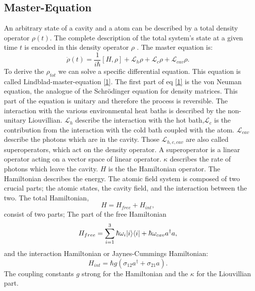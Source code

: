 \documentclass[12pt,a4paper]{article}
\DeclarePairedDelimiter\bra{\langle}{\rvert}
\DeclarePairedDelimiter\ket{\lvert}{\rangle}
\begin{document}
\subsection{Master-Equation} 
An arbitrary state of a cavity and a atom can be described by a total density operator $\rho(t)$. %
The complete description of the total system's state at a given time $t$ is encoded in this density 
operator $\rho$ \cite{Li2017}.
The master equation is:
\begin{equation}
\dot{\rho}(t)=\frac{1}{i \hbar}[H,\rho]+ \mathcal{L}_{h}\rho+ \mathcal{L}_{c}\rho+ \mathcal{L}_{cav}\rho. \label{1}
\end{equation}
To derive the $\rho_{tot}$ we can solve a specific differential equation. This equation is called Lindblad-master-equation \eqref{1}. 
The first part of eq \eqref{1} is the von Neuman equation,  the analogue of the Schrödinger equation for density matrices. This part of the equation is unitary and therefore the process is reversible.
The interaction with the various environmental heat baths is described by the non-unitary Liouvillian. $\mathcal{L}_h$ describe the interaction with the hot bath,$\mathcal{L}_c$ is the contribution from the interaction with the cold bath coupled with the atom.  $\mathcal{L}_{cav}$ describe the photons which are in the cavity.  Those $\mathcal{L}_{h,c,cav}$ are also called superoperators, which act on the density operator.  A superoperator is a linear operator acting on a vector space of linear operator. 
$\kappa$ describes the rate of photons which leave the cavity.
$H$ is the the Hamiltonian operator. 
The Hamiltonian describes the energy. 
The atomic field system is composed of two crucial 
parts; the atomic states, the cavity field, and the interaction between the two.
The total Hamiltonian,
\begin{equation}
H=H_{free}+H_{int},
\end{equation}
consist of two parts; The part of the free Hamiltonian 
\begin{equation}
H_{free}=\sum_{i=1}^3 \hbar \omega_i \ket{i}\bra{i}+\hbar \omega_{cav} a^{\dag}a,\label{2}
\end{equation}
and the interaction Hamiltonian or Jaynes-Cummings Hamiltonian:
\begin{equation}
H_{int}=\hbar g(\sigma_{12}a^{\dag}+\sigma_{21}a).\label{3}
\end{equation}
The coupling constants $g$ strong for the Hamiltonian and the $\kappa$ for the Liouvillian part. 
\end{document}
